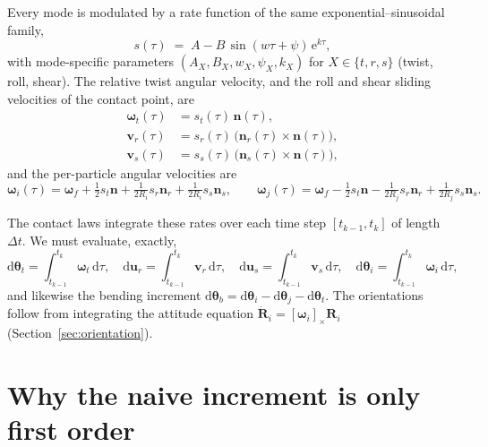 \documentclass[11pt]{article}
\newcommand{\dd}{\,\mathrm{d}}
\newcommand{\e}{\mathrm{e}}
\newcommand{\bw}{\boldsymbol{\omega}}
\newcommand{\bwf}{\boldsymbol{\omega}_f}
\newcommand{\Dt}{\Delta t}
\begin{document}
Every mode is modulated by a rate function of the same exponential--sinusoidal family,
\begin{equation}
  s(\tau)\;=\;A - B\,\sin(w\tau+\psi)\,\e^{k\tau},
  \label{eq:rate}
\end{equation}
with mode-specific parameters $(A_X,B_X,w_X,\psi_X,k_X)$ for $X\in\{t,r,s\}$ (twist, roll,
shear). The relative twist angular velocity, and the roll and shear sliding velocities of
the contact point, are
\begin{align}
  \boldsymbol{\omega}_t(\tau) &= s_t(\tau)\,\mathbf{n}(\tau), \label{eq:wt}\\
  \mathbf{v}_r(\tau) &= s_r(\tau)\,\big(\mathbf{n}_r(\tau)\times\mathbf{n}(\tau)\big), \label{eq:vr}\\
  \mathbf{v}_s(\tau) &= s_s(\tau)\,\big(\mathbf{n}_s(\tau)\times\mathbf{n}(\tau)\big), \label{eq:vs}
\end{align}
and the per-particle angular velocities are
\begin{equation}
  \bw_i(\tau) = \bwf + \tfrac12 s_t \mathbf{n}
              + \tfrac{1}{2R_i} s_r \mathbf{n}_r
              + \tfrac{1}{2R_i} s_s \mathbf{n}_s,
  \qquad
  \bw_j(\tau) = \bwf - \tfrac12 s_t \mathbf{n}
              - \tfrac{1}{2R_j} s_r \mathbf{n}_r
              + \tfrac{1}{2R_j} s_s \mathbf{n}_s .
  \label{eq:wij}
\end{equation}

The contact laws integrate these rates over each time step $[t_{k-1},t_k]$ of length
$\Dt$. We must evaluate, exactly,
\begin{equation}
  \mathrm{d}\boldsymbol{\theta}_t = \!\int_{t_{k-1}}^{t_k}\!\!\boldsymbol{\omega}_t\dd\tau,\quad
  \mathrm{d}\mathbf{u}_r = \!\int_{t_{k-1}}^{t_k}\!\!\mathbf{v}_r\dd\tau,\quad
  \mathrm{d}\mathbf{u}_s = \!\int_{t_{k-1}}^{t_k}\!\!\mathbf{v}_s\dd\tau,\quad
  \mathrm{d}\boldsymbol{\theta}_{i} = \!\int_{t_{k-1}}^{t_k}\!\!\bw_i\dd\tau,
  \label{eq:increments}
\end{equation}
and likewise the bending increment
$\mathrm{d}\boldsymbol{\theta}_b=\mathrm{d}\boldsymbol{\theta}_i-\mathrm{d}\boldsymbol{\theta}_j-\mathrm{d}\boldsymbol{\theta}_t$.
The orientations follow from integrating the attitude equation
$\dot{\mathbf{R}}_i=[\bw_i]_\times\mathbf{R}_i$ (Section~\ref{sec:orientation}).

\section{Why the naive increment is only first order}
\label{sec:naive}
\end{document}
